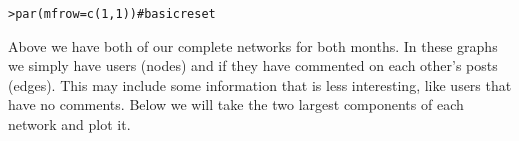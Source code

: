 \documentclass[12pt]{article}\usepackage[]{graphicx}\usepackage[]{color}
\makeatletter
\newcommand{\hlnum}[1]{\textcolor[rgb]{0.82,0.78,0.62}{#1}}%
\newcommand{\hlcom}[1]{\textcolor[rgb]{0.404,0.408,0.42}{#1}}%
\newcommand{\hlstd}[1]{\textcolor[rgb]{0.882,0.878,0.898}{#1}}%
\newcommand{\hlkwc}[1]{\textcolor[rgb]{0.812,0.522,0.388}{#1}}%
\newcommand{\hlkwd}[1]{\textcolor[rgb]{0.733,0.388,0.812}{#1}}%
\newenvironment{kframe}{%
 \def\at@end@of@kframe{}%
 \ifinner\ifhmode%
  \def\at@end@of@kframe{\end{minipage}}%
  \begin{minipage}{\columnwidth}%
 \fi\fi%
 \def\FrameCommand##1{\hskip\@totalleftmargin \hskip-\fboxsep
 \colorbox{shadecolor}{##1}\hskip-\fboxsep
     \hskip-\linewidth \hskip-\@totalleftmargin \hskip\columnwidth}%
 \MakeFramed {\advance\hsize-\width
   \@totalleftmargin\z@ \linewidth\hsize
   \@setminipage}}%
 {\par\unskip\endMakeFramed%
 \at@end@of@kframe}
\newenvironment{knitrout}{}{} %
\makeatother
\begin{document}
\begin{flushleft}
\begin{center}
\begin{knitrout}
\begin{kframe}\begin{alltt}
\hlstd{> }\hlkwd{par}\hlstd{(}\hlkwc{mfrow}\hlstd{=}\hlkwd{c}\hlstd{(}\hlnum{1}\hlstd{,}\hlnum{1}\hlstd{))} \hlcom{# basic reset}
\end{alltt}
\end{kframe}
\end{knitrout}
\end{center}

Above we have both of our complete networks for both months. In these graphs we simply have users (nodes) and if they have commented on each other's posts (edges). This may include some information that is less interesting, like users that have no comments. Below we will take the two largest components of each network and plot it.


\end{flushleft}
\end{document}
